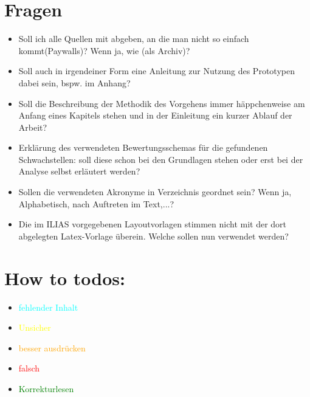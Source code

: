 \section*{Fragen}
    \begin{itemize}
        \item Soll ich alle Quellen mit abgeben, an die man nicht so einfach kommt(Paywalls)? Wenn ja, wie (als Archiv)?
        \item Soll auch in irgendeiner Form eine Anleitung zur Nutzung des Prototypen dabei sein, bspw. im Anhang?
        \item Soll die Beschreibung der Methodik des Vorgehens immer häppchenweise am Anfang eines Kapitels stehen und in der Einleitung ein kurzer Ablauf der Arbeit?
        \item Erklärung des verwendeten Bewertungsschemas für die gefundenen Schwachstellen: soll diese schon bei den Grundlagen stehen oder erst bei der Analyse selbst erläutert werden?
        \item Sollen die verwendeten Akronyme in Verzeichnis geordnet sein? Wenn ja, Alphabetisch, nach Auftreten im Text,...?
        \item Die im ILIAS vorgegebenen Layoutvorlagen stimmen nicht mit der dort abgelegten Latex-Vorlage überein. Welche sollen nun verwendet werden?
    \end{itemize}
    
\section*{How to todos:}
    \begin{itemize}
        \item \textcolor{cyan}{fehlender Inhalt}
        \item \textcolor{yellow}{Unsicher}
        \item \textcolor{orange}{besser ausdrücken}
        \item \textcolor{red}{falsch}
        \item \textcolor{green}{Korrekturlesen}
    \end{itemize}
    
